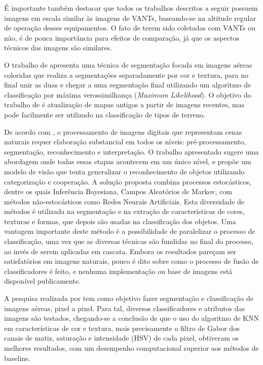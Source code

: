 É importante também destacar que todos os trabalhos descritos a seguir possuem imagens em escala similar às imagens de VANTs, baseando-se na altitude regular de operação desses equipamentos. O fato de terem sido coletadas com VANTs ou não, é de pouca importância para efeitos de comparação, já que os aspectos técnicos das imagens são similares.

O trabalho de  apresenta uma técnica de segmentação focada em imagens aéreas coloridas que realiza a segmentações separadamente por cor e textura, para no final unir as duas e chegar a uma segmentação final utilizando um algoritmo de classificação por máxima verossimilhança (\textit{Maximum Likelihood}). O objetivo do trabalho de  é atualização de mapas antigos a partir de imagens recentes, mas pode facilmente ser utilizado na classificação de tipos de terreno.

De acordo com , o processamento de imagens digitais que representam cenas naturais requer elaboração substancial em todos os níveis: pré-processamento, segmentação, reconhecimento e interpretação. O trabalho apresentado sugere uma abordagem onde todas essas etapas acontecem em um único nível, e propõe um modelo de visão que tenta generalizar o reconhecimento de objetos utilizando categorização e cooperação.  A solução proposta combina processos estocásticos, dentre os quais Inferência Bayesiana, Campos Aleatórios de Markov, com métodos não-estocásticos como Redes Neurais Artificiais. Esta diversidade de métodos é utilizada na segmentação e na extração de características de cores, texturas e formas, que depois são usadas na classificação dos objetos. Uma vantagem importante deste método é a possibilidade de paralelizar o processo de classificação, uma vez que as diversas técnicas são fundidas no final do processo, ao invés de serem aplicadas em cascata. Embora os resultados pareçam ser satisfatórios em imagens naturais, pouco é dito sobre como o processo de fusão de classificadores é feito, e nenhuma implementação ou base de imagens está disponível publicamente.

A pesquisa realizada por  tem como objetivo fazer segmentação e classificação de imagens aéreas, pixel a pixel. Para tal, diversos classificadores e atributos das imagens são testados, chegando-se a conclusão de que o uso do algoritmo de KNN em características de cor e textura, mais precisamente o filtro de Gabor \cite{fogel:1989} dos canais de matiz, saturação e intensidade (HSV) de cada pixel, obtiveram os melhores resultados, com um desempenho computacional superior aos métodos de baseline.

